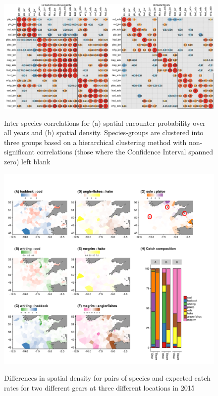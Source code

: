 \documentclass{article}
\begin{document}
\begin{figure}
\begin{center}
	\includegraphics[width = \linewidth]{"Figure 1 - Omega1Omega2_Correlations_blank"}
	\label{fig:3}
	\caption{Inter-species correlations for (a) spatial encounter
		probability over all years and (b) spatial density.
		Species-groups are clustered into three groups based on a
		hierarchical clustering method with non-significant
		correlations (those where the Confidence Interval spanned zero)
		left blank}
	\end{center}
\end{figure}

\begin{figure}
\begin{center}
	\includegraphics[width = \linewidth]{"Figure 4 - DensityDifferencesFigureswithCC"}
	\label{fig:4}
	\caption{Differences in spatial density for pairs of species and
		expected catch rates for two different gears at three different
	locations in 2015}
\end{center}
\end{figure}
\end{document}
